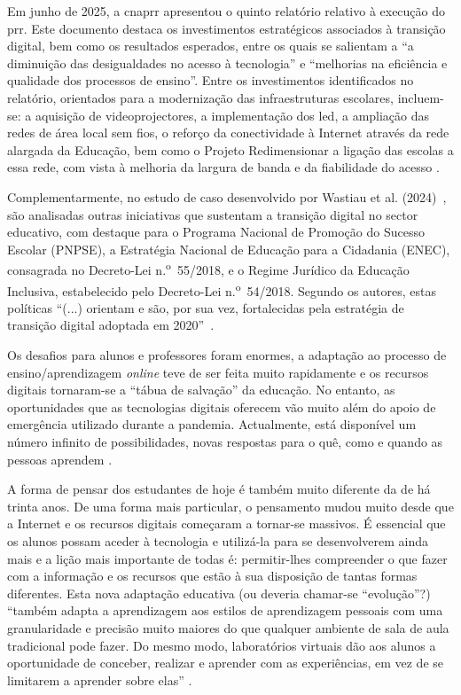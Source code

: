 Em junho de 2025, a \acrshort{cnaprr} apresentou o quinto relatório relativo à execução do \acrshort{prr}. Este documento destaca os investimentos estratégicos associados à transição digital, bem como os resultados esperados, entre os quais se salientam a ``a diminuição das desigualdades no acesso à tecnologia'' e ``melhorias na eficiência e qualidade dos processos de ensino''. Entre os investimentos identificados no relatório, orientados para a modernização das infraestruturas escolares, incluem-se: a aquisição de videoprojectores, a implementação dos \acrfull{led}, a ampliação das redes de área local sem fios, o reforço da conectividade à Internet através da rede alargada da Educação, bem como o Projeto Redimensionar a ligação das escolas a essa rede, com vista à melhoria da largura de banda e da fiabilidade do acesso \cite{cnaprr2025}.

Complementarmente, no estudo de caso desenvolvido por Wastiau et al. (2024)~\cite{estrategiatransdigital}, são analisadas outras iniciativas que sustentam a transição digital no sector educativo, com destaque para o Programa Nacional de Promoção do Sucesso Escolar (PNPSE), a Estratégia Nacional de Educação para a Cidadania (ENEC), consagrada no Decreto-Lei n.\textsuperscript{o}~55/2018, e o Regime Jurídico da Educação Inclusiva, estabelecido pelo Decreto-Lei n.\textsuperscript{o}~54/2018. Segundo os autores, estas políticas ``(...) orientam e são, por sua vez, fortalecidas pela estratégia de transição digital adoptada em 2020''~\cite{estrategiatransdigital}.

Os desafios para alunos e professores foram enormes, a adaptação ao processo de ensino/aprendizagem \textit{online} teve de ser feita muito rapidamente e os recursos digitais tornaram-se a ``tábua de salvação'' da educação. No entanto, as oportunidades que as tecnologias digitais oferecem vão muito além do apoio de emergência utilizado durante a pandemia. Actualmente, está disponível um número infinito de possibilidades, novas respostas para o quê, como e quando as pessoas aprendem \cite{oecd_state_2021}.

A forma de pensar dos estudantes de hoje é também muito diferente da de há trinta anos. De uma forma mais particular, o pensamento mudou muito desde que a Internet e os recursos digitais começaram a tornar-se massivos. É essencial que os alunos possam aceder à tecnologia e utilizá-la para se desenvolverem ainda mais e a lição mais importante de todas é: permitir-lhes compreender o que fazer com a informação e os recursos que estão à sua disposição de tantas formas diferentes. Esta nova adaptação educativa (ou deveria chamar-se ``evolução''?) ``também adapta a aprendizagem aos estilos de aprendizagem pessoais com uma granularidade e precisão muito maiores do que qualquer ambiente de sala de aula tradicional pode fazer. Do mesmo modo, laboratórios virtuais dão aos alunos a oportunidade de conceber, realizar e aprender com as experiências, em vez de se limitarem a aprender sobre elas'' \cite{oecd_state_2021}.

